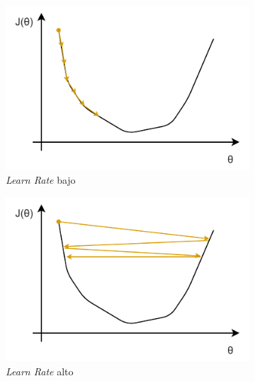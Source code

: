 \begin{figure}[h]
\centering
    \begin{subfigure}{0.49\textwidth}
        \centering
        \includegraphics[width=\textwidth]{figuras/implementacion/learn rate bajo.pdf}
        \caption{\textit{Learn Rate} bajo}
        \label{fig:LR_bajo}
    \end{subfigure}
    \hfill
    \begin{subfigure}{0.49\textwidth}
        \centering
        \includegraphics[width=\textwidth]{figuras/implementacion/learn rate alto.pdf}
        \caption{\textit{Learn Rate} alto}
        \label{fig:LR_alto}
    \end{subfigure}
    \hfill
    \begin{subfigure}{0.49\textwidth}
        \centering

\end{subfigure}
\end{figure}
